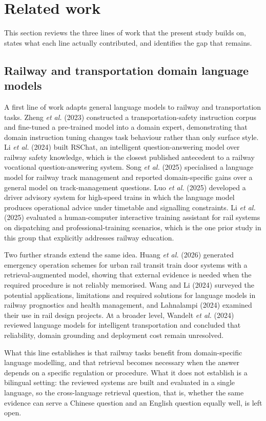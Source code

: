 \documentclass{article}
\begin{document}
\section{Related work}

This section reviews the three lines of work that the present study builds on, states what each line actually contributed, and identifies the gap that remains.

\subsection{Railway and transportation domain language models}

A first line of work adapts general language models to railway and transportation tasks. Zheng \emph{et al.} (2023) constructed a transportation-safety instruction corpus and fine-tuned a pre-trained model into a domain expert, demonstrating that domain instruction tuning changes task behaviour rather than only surface style. Li \emph{et al.} (2024) built RSChat, an intelligent question-answering model over railway safety knowledge, which is the closest published antecedent to a railway vocational question-answering system. Song \emph{et al.} (2025) specialised a language model for railway track management and reported domain-specific gains over a general model on track-management questions. Luo \emph{et al.} (2025) developed a driver advisory system for high-speed trains in which the language model produces operational advice under timetable and signalling constraints. Li \emph{et al.} (2025) evaluated a human-computer interactive training assistant for rail systems on dispatching and professional-training scenarios, which is the one prior study in this group that explicitly addresses railway education.

Two further strands extend the same idea. Huang \emph{et al.} (2026) generated emergency operation schemes for urban rail transit train door systems with a retrieval-augmented model, showing that external evidence is needed when the required procedure is not reliably memorised. Wang and Li (2024) surveyed the potential applications, limitations and required solutions for language models in railway prognostics and health management, and Lahnalampi (2024) examined their use in rail design projects. At a broader level, Wandelt \emph{et al.} (2024) reviewed language models for intelligent transportation and concluded that reliability, domain grounding and deployment cost remain unresolved.

What this line establishes is that railway tasks benefit from domain-specific language modelling, and that retrieval becomes necessary when the answer depends on a specific regulation or procedure. What it does not establish is a bilingual setting: the reviewed systems are built and evaluated in a single language, so the cross-language retrieval question, that is, whether the same evidence can serve a Chinese question and an English question equally well, is left open.
\end{document}
